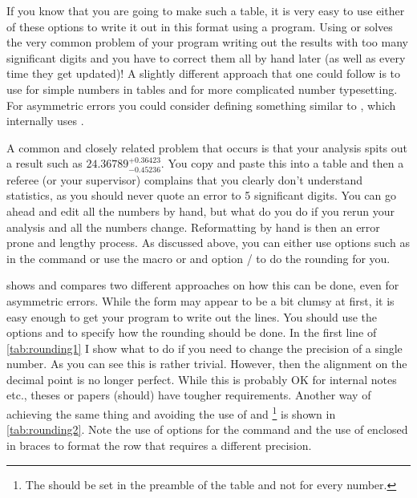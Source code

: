 If you know that you are going to make such a table, it is very easy
to use either of these options to write it out in this format using a program. 
Using  or  solves the very common problem of your
program writing out the results with too many significant digits and
you have to correct them all by hand later (as well as every time they
get updated)!  A slightly different approach that one could follow is
to use  for simple numbers in tables and  for
more complicated number typesetting.  For asymmetric errors you could
consider defining something similar to , which
internally uses .

A common and closely related problem that occurs is that your analysis
spits out a result such as \(24.36789^{+0.36423}_{-0.45236}\). You copy
and paste this into a table and then a referee (or your supervisor)
complains that you clearly don't understand statistics, as you should
never quote an error to 5 significant digits. You can go ahead and
edit all the numbers by hand, but what do you do if you rerun your
analysis and all the numbers change.
Reformatting by hand is then an error prone and lengthy process.
As discussed above, you can either use options such as 
 in the  command or use the macro
 or  
and option / to do the
rounding for you.

 shows and compares two different approaches
on how this can be done, even for asymmetric errors.
While the form
may appear to be a bit clumsy at first, it is easy enough to get your
program to write out the lines. 
You should use the options  and
 to specify how the rounding should be done.
In the first line of \cref{tab:rounding1}
I show what to do if you need to change the precision of a single number.
As you can see this is rather trivial.
However, then the alignment on the decimal point is no longer perfect.
While this is probably OK for internal notes etc.,
theses or papers (should) have tougher requirements.
Another way of achieving the same thing and
avoiding the use of  and
\footnote{%
  The  should be set in the preamble of the table and
  not for every number.}
is shown in \cref{tab:rounding2}.
Note the use of options for the  command
and the use of  enclosed in braces
to format the row that requires a different precision.

